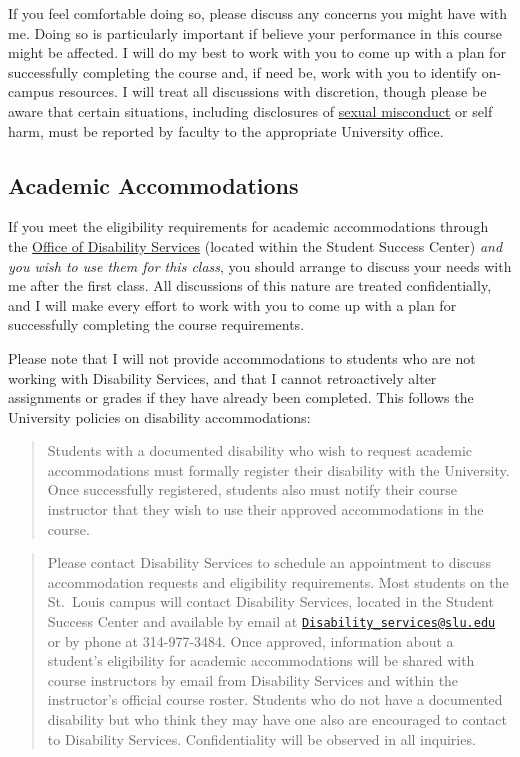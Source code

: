 \documentclass[
]{book}
\begin{document}
If you feel comfortable doing so, please discuss any concerns you might have with me. Doing so is particularly important if believe your performance in this course might be affected. I will do my best to work with you to come up with a plan for successfully completing the course and, if need be, work with you to identify on-campus resources. I will treat all discussions with discretion, though please be aware that certain situations, including disclosures of \href{/syllabus/harassment-and-title-ix.html}{sexual misconduct} or self harm, must be reported by faculty to the appropriate University office.

\hypertarget{academic-accommodations}{%
\subsection{Academic Accommodations}\label{academic-accommodations}}

If you meet the eligibility requirements for academic accommodations through the \href{https://www.slu.edu/life-at-slu/student-success-center/disability-services/index.php}{Office of Disability Services} (located within the Student Success Center) \emph{and you wish to use them for this class}, you should arrange to discuss your needs with me after the first class. All discussions of this nature are treated confidentially, and I will make every effort to work with you to come up with a plan for successfully completing the course requirements.

Please note that I will not provide accommodations to students who are not working with Disability Services, and that I cannot retroactively alter assignments or grades if they have already been completed. This follows the University policies on disability accommodations:

\begin{quote}
Students with a documented disability who wish to request academic accommodations must formally register their disability with the University. Once successfully registered, students also must notify their course instructor that they wish to use their approved accommodations in the course.
\end{quote}

\begin{quote}
Please contact Disability Services to schedule an appointment to discuss accommodation requests and eligibility requirements. Most students on the St.~Louis campus will contact Disability Services, located in the Student Success Center and available by email at \href{mailto:Disability_services@slu.edu}{\nolinkurl{Disability\_services@slu.edu}} or by phone at 314-977-3484. Once approved, information about a student's eligibility for academic accommodations will be shared with course instructors by email from Disability Services and within the instructor's official course roster. Students who do not have a documented disability but who think they may have one also are encouraged to contact to Disability Services. Confidentiality will be observed in all inquiries.
\end{quote}
\end{document}
